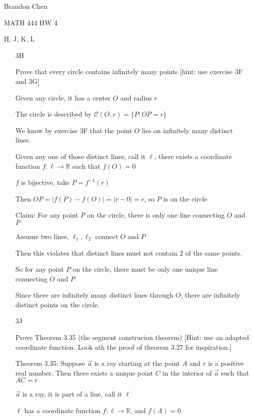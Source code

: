 \documentclass[11pt]{article}
\begin{document}
\noindent Brandon Chen

\noindent MATH 444 HW 4

 H, J, K, L

\begin{itemize}

	\item[3H]

		Prove that every circle contains infinitely many points [hint: use exercise 3F and 3G]

		Given any circle, it has a center $O$ and radius $r$

		The circle is described by $\mathscr{C}(O,r) = \{P:OP = r\}$

		We know by exercise 3F that the point $O$ lies on infinitely many distinct lines. 

		Given any one of those distinct lines, call it $\ell$, there exists a coordinate function $f:\ell \rightarrow \mathbb{R}$ such that $f(O) = 0$

		$f$ is bijective, take $P = f^{-1} (r)$

		Then $OP = |f(P) - f(O)| = |r - 0| = r$, so $P$ is on the circle

		Claim: For any point $P$ on the circle, there is only one line connecting $O$ and $P$

		\indent Assume two lines, $\ell_1, \ell_2$ connect $O$ and $P$

		\indent Then this violates that distinct lines must not contain 2 of the same points. 

		So for any point $P$ on the circle, there must be only one unique line connecting $O$ and $P$

		Since there are infinitely many distinct lines through $O$, there are infinitely distinct points on the circle.

	\item[3J]

		Prove Theorem 3.35 (the segment construcion theorem) [Hint: use an adapted coordinate function. Look ath the proof of theorem 3.27 for inspiration.]	

		Theorem 3.35: Suppose $\overrightarrow{a}$ is a ray starting at the point $A$ and $r$ is a positive real number. Then there exists a unique point $C$ in the interior of $\overrightarrow{a}$ such that $AC = r$

		$\overrightarrow{a}$ is a ray, it is part of a line, call it $\ell$

		$\ell$ has a coordinate function $f:\ell \rightarrow \mathbb{R}$, and $f(A) = 0$


\end{itemize}
\end{document}
